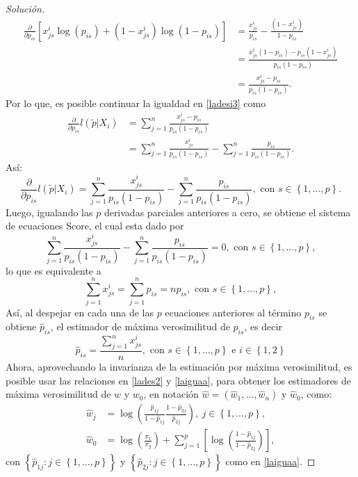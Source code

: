 \documentclass[10.5pt,notitlepage]{article}
\newenvironment{solucion}
  {\begin{proof}[Solución]}
  {\end{proof}}
\newcommand{\corch}[1]{\left[ #1 \right]}
\newcommand{\kis}[1]{\left\{ #1 \right\}}
\newcommand{\pare}[1]{\left( #1 \right)}
\theoremstyle{plain}
\begin{document}
\begin{solucion}
 \begin{align*}
     \frac{\partial}{\partial p_{is}}\corch{x_{js}^{i}\log(p_{is}) + (1 - x_{js}^{i})\log(1 - p_{is})} &= \frac{x_{js}^{i}}{p_{is}} - \frac{(1 - x_{js}^{i})}{1 - p_{is}}\\
                                                                                                       &= \frac{x_{js}^{i}(1 - p_{is}) - p_{is}(1 - x_{js}^i)}{p_{is}(1 - p_{is})}\\
                                                                                                       &= \frac{x_{js}^{i} - p_{is}}{p_{is}(1 - p_{is})}.
 \end{align*}
 Por lo que, es posible continuar la igualdad en \eqref{ladesi3} como  
 \begin{align*}
         \frac{\partial}{\partial p_{is}} l\pare{\widetilde{p}|X_{i}} &=\sum_{j = 1}^{n}\frac{x_{js}^{i} - p_{is}}{p_{is}(1 - p_{is})}\\ 
                                                                      &=\sum_{j = 1}^{n}\frac{x_{js}^{i}}{p_{is}(1 - p_{is})} - \sum_{j = 1}^{n}\frac{p_{is}}{p_{is}(1 - p_{is})}. 
 \end{align*}
Así: 
\[
 \frac{\partial}{\partial p_{is}} l\pare{\widetilde{p}|X_{i}} =\sum_{j = 1}^{n}\frac{x_{js}^{i}}{p_{is}(1 - p_{is})} - \sum_{j = 1}^{n}\frac{p_{is}}{p_{is}(1 - p_{is})}, \text{ con } s \in \kis{1,\hdots, p}. 
\]
Luego, igualando las \(p\) derivadas parciales anteriores a cero, se obtiene el sistema de ecuaciones Score, el cual esta dado por
\[
\sum_{j = 1}^{n}\frac{x_{js}^{i}}{p_{is}(1 - p_{is})} - \sum_{j = 1}^{n}\frac{p_{is}}{p_{is}(1 - p_{is})}= 0, \text{ con } s \in \kis{1,\hdots, p},
\]
lo que es equivalente a 
\[
\sum_{j = 1}^{n}x_{js}^{i} = \sum_{j = 1}^{n}p_{is} = np_{is}, \text{ con } s \in \kis{1,\hdots, p},
\]
 Así, al despejar en cada una de las \(p\) ecuaciones anteriores al término \(p_{is}\) se obtiene \(\hat{p}_{is}\), el estimador de máxima verosimilitud de \(p_{is}\), es decir
\begin{equation}\label{laiguaa}
    \hat{p}_{is} = \frac{\sum_{j = 1}^{n}x_{js}^{i}}{n}, \text{ con }  s \in \kis{1,\hdots, p} \text{ e } i \in \kis{1,2}
\end{equation}
Ahora, aprovechando la invarianza de la estimación por máxima verosimilitud, es posible usar las relaciones en \eqref{lades2} y \eqref{laiguaa}, para obtener los estimadores de máxima verosimilitud de \(w\) y \(w_0\), en notación \(\hat{w} = (\hat{w}_1, \hdots, \hat{w}_n)\) y \(\hat{w}_0\), como: 
\begin{align*}
      \hat{w}_j &= \log\pare{\frac{\hat{p}_{1j}}{1 - \hat{p}_{1j}}\frac{1 - \hat{p}_{2j}}{\hat{p}_{2j}}},\  j \in \kis{1, \hdots, p}, \nonumber\\ 
      \hat{w}_0 &= \log\pare{ \frac{\pi_{1}}{\pi_{2}}} + \sum_{j = 1}^{p}\corch{\log\pare{\frac{1 - \hat{p}_{1j}}{1 - \hat{p}_{2j}}}},
\end{align*}
con \(\kis{\hat{p}_{1j}: j\in \kis{1, \hdots, p}}\) y  \(\kis{\hat{p}_{2j}: j\in \kis{1, \hdots, p}}\) como en \eqref{laiguaa}.
\end{solucion}
\end{document}
